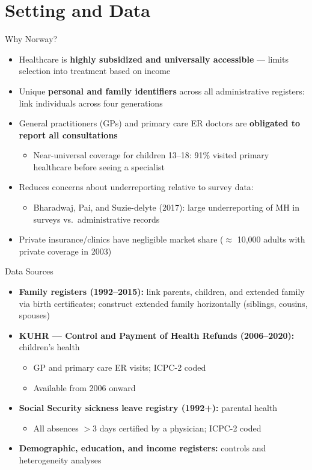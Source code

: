 \documentclass[aspectratio=169]{beamer}
\begin{document}
\section{Setting and Data}

\begin{frame}{Why Norway?}
  \begin{itemize}
    \item Healthcare is \textbf{highly subsidized and universally accessible} --- limits selection into treatment based on income
    \item Unique \textbf{personal and family identifiers} across all administrative registers: link individuals across four generations
    \item General practitioners (GPs) and primary care ER doctors are \textbf{obligated to report all consultations}
    \begin{itemize}
      \item Near-universal coverage for children 13--18: 91\% visited primary healthcare before seeing a specialist
    \end{itemize}
    \item Reduces concerns about underreporting relative to survey data:
    \begin{itemize}
      \item Bharadwaj, Pai, and Suzie-delyte (2017): large underreporting of MH in surveys vs.\ administrative records
    \end{itemize}
    \item Private insurance/clinics have negligible market share ($\approx$ 10,000 adults with private coverage in 2003)
  \end{itemize}
\end{frame}

\begin{frame}{Data Sources}
  \begin{itemize}
    \item \textbf{Family registers (1992--2015):} link parents, children, and extended family via birth certificates; construct extended family horizontally (siblings, cousins, spouses)
    \item \textbf{KUHR --- Control and Payment of Health Refunds (2006--2020):} children's health
    \begin{itemize}
      \item GP and primary care ER visits; ICPC-2 coded
      \item Available from 2006 onward
    \end{itemize}
    \item \textbf{Social Security sickness leave registry (1992+):} parental health
    \begin{itemize}
      \item All absences $>3$ days certified by a physician; ICPC-2 coded
    \end{itemize}
    \item \textbf{Demographic, education, and income registers:} controls and heterogeneity analyses
  \end{itemize}
\end{frame}
\end{document}
